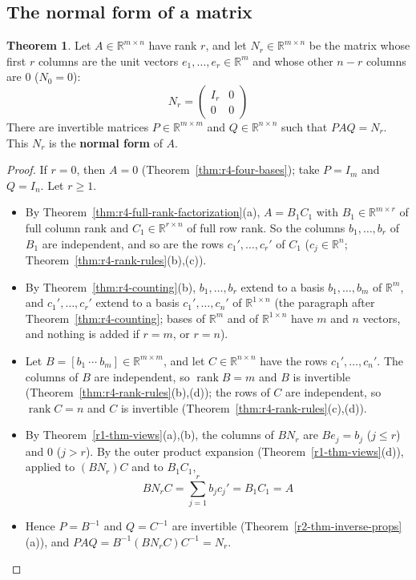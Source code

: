\documentclass[12pt]{article}
\newcommand{\R}{\mathbb R}
\DeclareMathOperator{\rank}{rank}
\theoremstyle{definition}
\newtheorem{theorem}{Theorem}
\begin{document}
\subsection*{The normal form of a matrix}

\begin{theorem}\label{thm:r4-normal-form}
Let \(A\in\R^{m\times n}\) have rank \(r\), and let \(N_r\in\R^{m\times n}\) be the matrix whose first \(r\) columns
are the unit vectors \(e_1,\dots,e_r\in\R^m\) and whose other \(n-r\) columns are \(0\) (\(N_0=0\)):
\[
N_r=\begin{pmatrix}I_r&0\\0&0\end{pmatrix}
\]
There are invertible matrices \(P\in\R^{m\times m}\) and \(Q\in\R^{n\times n}\) such that \(PAQ=N_r\). This \(N_r\) is
the \textbf{normal form} of \(A\).
\end{theorem}
\begin{proof}
If \(r=0\), then \(A=0\) (Theorem~\ref{thm:r4-four-bases}); take \(P=I_m\) and \(Q=I_n\). Let \(r\geqslant1\).
\begin{itemize}
\item By Theorem~\ref{thm:r4-full-rank-factorization}(a), \(A=B_1C_1\) with \(B_1\in\R^{m\times r}\) of full column
rank and \(C_1\in\R^{r\times n}\) of full row rank. So the columns \(b_1,\dots,b_r\) of \(B_1\) are independent, and so
are the rows \(c_1',\dots,c_r'\) of \(C_1\) (\(c_j\in\R^n\); Theorem~\ref{thm:r4-rank-rules}(b),(c)).
\item By Theorem~\ref{thm:r4-counting}(b), \(b_1,\dots,b_r\) extend to a basis \(b_1,\dots,b_m\) of \(\R^m\), and
\(c_1',\dots,c_r'\) extend to a basis \(c_1',\dots,c_n'\) of \(\R^{1\times n}\) (the paragraph after
Theorem~\ref{thm:r4-counting}; bases of \(\R^m\) and of \(\R^{1\times n}\) have \(m\) and \(n\) vectors, and nothing is
added if \(r=m\), or \(r=n\)).
\item Let \(B=[b_1\ \cdots\ b_m]\in\R^{m\times m}\), and let \(C\in\R^{n\times n}\) have the rows
\(c_1',\dots,c_n'\). The columns of \(B\) are independent, so \(\rank B=m\) and \(B\) is invertible
(Theorem~\ref{thm:r4-rank-rules}(b),(d)); the rows of \(C\) are independent, so \(\rank C=n\) and \(C\) is invertible
(Theorem~\ref{thm:r4-rank-rules}(c),(d)).
\item By Theorem~\ref{r1-thm-views}(a),(b), the columns of \(BN_r\) are \(Be_j=b_j\) (\(j\leqslant r\)) and \(0\)
(\(j>r\)). By the outer product expansion (Theorem~\ref{r1-thm-views}(d)), applied to \((BN_r)C\) and to \(B_1C_1\),
\[
BN_rC=\sum_{j=1}^rb_jc_j'=B_1C_1=A
\]
\item Hence \(P=B^{-1}\) and \(Q=C^{-1}\) are invertible (Theorem~\ref{r2-thm-inverse-props}(a)), and
\(PAQ=B^{-1}(BN_rC)C^{-1}=N_r\).\qedhere
\end{itemize}
\end{proof}
\end{document}
